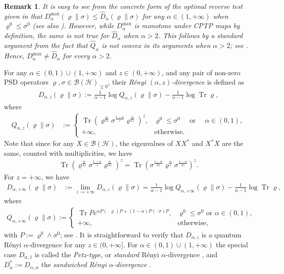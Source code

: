\documentclass[unsortedaddress,superscriptaddress,pra,notitlepage]{revtex4}
\newtheorem{rem}[definition]{Remark}
\def\B{{\mathcal B}}
\def\rho{\varrho}
\def\hil{{\mathcal H}}
\def\bz{\left(}
\def\jz{\right)}
\def\what{\widehat}
\def\nw{^{*}}
\def\pne{_{\gneq 0}}
\newcommand{\ki}[1]{\textit{\textit{#1}}}
\newcommand{\ds}{\mbox{ }\mbox{ }}
\DeclareMathOperator{\Tr}{Tr}
\DeclareMathOperator{\logn}{\widehat\log}
\begin{document}
\begin{rem}
It is easy to see from the concrete form of the optimal reverse test 
given in \cite[Section 4.2]{Matsumoto_newfdiv} that 
$D_{\alpha}^{\max}(\rho\|\sigma)\le \what D_{\alpha}(\rho\|\sigma)$
for any $\alpha\in(1,+\infty)$ when 
$\rho^0\le\sigma^0$ (see also \cite[Section 4.2.3]{TomamichelBook}). 
However, while $D_{\alpha}^{\max}$ is monotone under CPTP maps by definition, 
the same is not true for $\what D_{\alpha}$ when $\alpha>2$. 
This follows by a standard argument from the fact that 
$\what Q_{\alpha}$ is not convex in its arguments when $\alpha>2$; see 
\cite[Proposition A.1]{HiaiMosonyi2017}.
Hence, $D_{\alpha}^{\max}\ne\what D_{\alpha}$ for every $\alpha>2$.
\end{rem}

For any $\alpha\in(0,1)\cup(1,+\infty)$ and $z\in(0,+\infty)$, and any pair of non-zero
PSD operators $\rho,\sigma\in\B(\hil)\pne$, their 
\ki{R\'enyi $(\alpha,z)$-divergence} is defined as \cite{AD,JOPP}
\begin{align*}
D_{\alpha,z}(\rho\|\sigma):=\frac{1}{\alpha-1}\log Q_{\alpha,z}(\rho\|\sigma) 
-\frac{1}{\alpha-1}\log\Tr\rho,
\end{align*}
where 
\begin{align}\label{Q alpha z def}
Q_{\alpha,z}(\rho\|\sigma)
&:=
\begin{cases}
\Tr\bz\rho^{\frac{\alpha}{2z}}\sigma^{\frac{1-\alpha}{z}}\rho^{\frac{\alpha}{2z}}\jz^z,&
\rho^0\le\sigma^0\ds\text{or}\ds\alpha\in(0,1),\\
+\infty,&\text{otherwise}.
\end{cases}
\end{align}
Note that since for any $X\in\B(\hil)$, the eigenvalues of $XX^*$ and $X^*X$ are 
the same, counted with multiplicities, we have 
\begin{align*}
\Tr\bz\rho^{\frac{\alpha}{2z}}\sigma^{\frac{1-\alpha}{z}}\rho^{\frac{\alpha}{2z}}\jz^z
=
\Tr\bz\sigma^{\frac{1-\alpha}{2z}}\rho^{\frac{\alpha}{z}}\sigma^{\frac{1-\alpha}{2z}}\jz^z.
\end{align*}
For $z=+\infty$, we have 
\begin{align*}
D_{\alpha,+\infty}(\rho\|\sigma)
&:=
\lim_{z\to+\infty}D_{\alpha,z}(\rho\|\sigma)
=
\frac{1}{\alpha-1}\log Q_{\alpha,+\infty}(\rho\|\sigma)-\frac{1}{\alpha-1}\log\Tr\rho,
\end{align*}
where
\begin{align*}
Q_{\alpha,+\infty}(\rho\|\sigma):=
\begin{cases}
\Tr Pe^{\alpha P(\logn\rho)P+(1-\alpha)P(\logn\sigma)P},&\rho^0\le\sigma^0\text{ or }\alpha\in(0,1),\\
+\infty,&\text{otherwise},
\end{cases}
\end{align*}
with $P:=\rho^0\wedge\sigma^0$; see \cite{AD,HP_GT,MO-cqconv}.
It is straightforward to verify that $D_{\alpha,z}$ is a quantum 
R\'enyi $\alpha$-divergence for any $z\in(0,+\infty]$. 
For $\alpha\in(0,1)\cup(1,+\infty)$ the special case
$D_{\alpha,1}$ is called the \ki{Petz-type}, or \ki{standard} R\'enyi
$\alpha$-divergence \cite{P86}, and 
$D_{\alpha}\nw:=D_{\alpha,\alpha}$ the \ki{sandwiched R\'enyi $\alpha$-divergence}
\cite{Renyi_new,WWY}.
\end{document}
